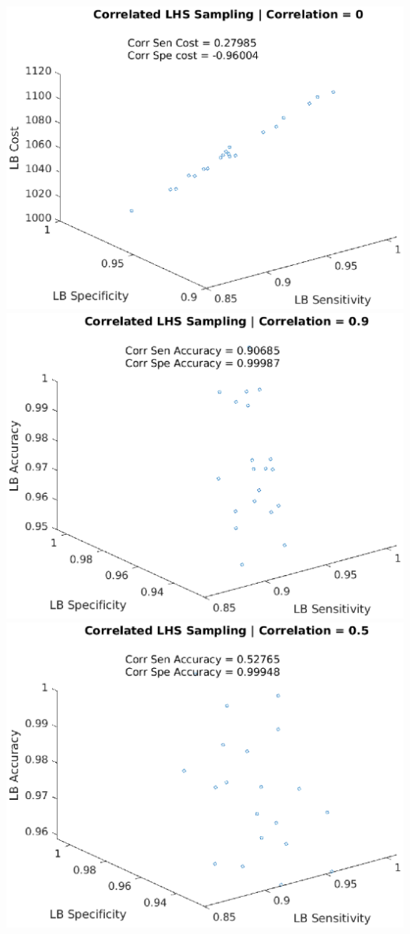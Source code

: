\documentclass[aspectratio=1610]{beamer}
\begin{document}
\begin{frame}
\includegraphics[scale = .3]{lbcorr3}\\
\includegraphics[scale = .3]{lbcorr4}
\includegraphics[scale = .3]{lbcorr5}

\end{frame}
\end{document}
